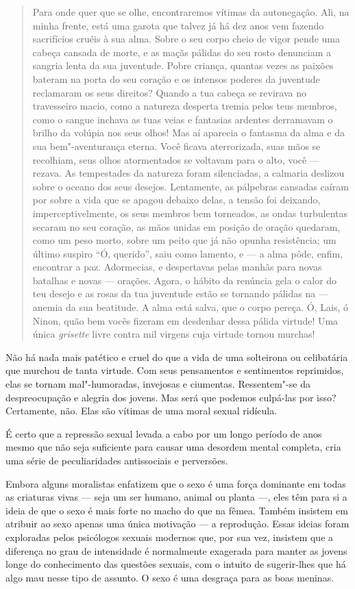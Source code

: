 \begin{quote}
Para onde quer que se olhe, encontraremos vítimas da autonegação. Ali,
na minha frente, está uma garota que talvez já há dez anos vem fazendo
sacrifícios cruéis à sua alma. Sobre o seu corpo cheio de vigor pende
uma cabeça cansada de morte, e as maçãs pálidas do seu rosto denunciam a
sangria lenta da sua juventude. Pobre criança, quantas vezes as paixões
bateram na porta do seu coração e os intensos poderes da juventude
reclamaram os seus direitos? Quando a tua cabeça se revirava no
travesseiro macio, como a natureza desperta tremia pelos teus membros,
como o sangue inchava as tuas veias e fantasias ardentes derramavam o
brilho da volúpia nos seus olhos! Mas aí aparecia o fantasma da alma e
da sua bem"-aventurança eterna. Você ficava aterrorizada, suas mãos se
recolhiam, seus olhos atormentados se voltavam para o alto, você --- rezava. As tempestades da natureza foram silenciadas, a calmaria
deslizou sobre o oceano dos seus desejos. Lentamente, as pálpebras
cansadas caíram por sobre a vida que se apagou debaixo delas, a tensão
foi deixando, imperceptivelmente, os seus membros bem torneados, as
ondas turbulentas secaram no seu coração, as mãos unidas em posição de
oração quedaram, como um peso morto, sobre um peito que já não opunha
resistência; um último suspiro ``Ó, querido'', saiu como lamento, e --- a
alma pôde, enfim, encontrar a paz. Adormecias, e despertavas pelas manhãs para
novas batalhas e novas --- orações. Agora, o hábito da renúncia gela o
calor do teu desejo e as rosas da tua juventude estão se tornando
pálidas na --- anemia da sua beatitude. A alma está salva, que o corpo
pereça. Ó, Lais, ó Ninon, quão bem vocês fizeram em desdenhar dessa
pálida virtude! Uma única \emph{grisette} livre contra mil virgens cuja
virtude tornou murchas!
\end{quote}

Não há nada mais patético e cruel do que a vida de uma solteirona ou
celibatária que murchou de tanta virtude. Com seus pensamentos e
sentimentos reprimidos, elas se tornam mal"-humoradas, invejosas e
ciumentas. Ressentem"-se da despreocupação e alegria dos jovens. Mas será
que podemos culpá-las por isso? Certamente, não. Elas são vítimas de uma
moral sexual ridícula.

É certo que a repressão sexual levada a cabo por um longo período de
anos mesmo que não seja suficiente para causar uma desordem mental
completa, cria uma série de peculiaridades antissociais e perversões.

Embora alguns moralistas enfatizem que o sexo é uma força dominante em
todas as criaturas vivas --- seja um ser humano, animal ou planta ---,
eles têm para si a ideia de que o sexo é mais forte no macho do que na
fêmea. Também insistem em atribuir ao sexo apenas uma única motivação --- a reprodução. Essas ideias foram exploradas pelos psicólogos sexuais
modernos que, por sua vez, insistem que a diferença no grau de intensidade é
normalmente exagerada para manter as jovens longe do conhecimento das
questões sexuais, com o intuito de sugerir-lhes que há algo mau nesse tipo de assunto. O sexo é uma desgraça para as boas meninas.

